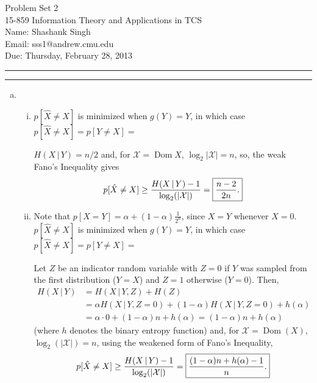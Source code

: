 \documentclass[11pt]{article}
\makeatletter
\newcounter{questionCounter}
\newcounter{partCounter}[questionCounter]
\newenvironment{question}[2][\arabic{questionCounter}]{%
    \setcounter{partCounter}{0}%
    \vspace{.25in} \hrule \vspace{0.5em}%
        \noindent{\bf #2}%
    \vspace{0.8em} \hrule \vspace{.10in}%
    \addtocounter{questionCounter}{1}%
}{}
\newcommand{\name}{Shashank Singh}
\newcommand{\andrew}{sss1@andrew.cmu.edu}
\newcommand{\class}{15-859 Information Theory and Applications in TCS}
\newcommand{\hwnum}{2}
\newcommand{\duedate}{Thursday, February 28, 2013}
\newcommand{\dom}{\operatorname{Dom}} %
\newcommand{\X}{\mathcal{X}}
\newcommand{\pr}[1]{\mathsf{Pr}\left( #1 \right)} %
\newcommand{\giv}{\, | \,} %
\makeatother
\begin{document}
\thispagestyle{plain}

{\Large Problem Set \hwnum} \\
\class \\
Name: \name \\
Email: \andrew \\
Due: \duedate

\begin{question}{Problem 1}
\begin{enumerate}[(a)]
\item
\begin{enumerate}[i.]
\item $p[\hat X \neq X]$ is minimized when $g(Y) = Y$, in which
case $p[\hat X \neq X] = p[Y \neq X] = $ 

$H(X \giv Y) = n/2$ and, for $\X = \dom X$, $\log_2|\X| = n$, so, the weak
Fano's Inequality gives
\[p[\hat X \neq X]
    \geq \frac{H(X \giv Y) - 1}{\log_2(|\X|)}
 = \mbox{\fbox{$\displaystyle \frac{n - 2}{2n}
$.}}\]

\item Note that $p[X = Y] = \alpha + (1 - \alpha)\frac{1}{2^n}$, since $X = Y$
whenever $X = 0$. $p[\hat X \neq X]$ is minimized when $g(Y) = Y$, in which
case
$p[\hat X \neq X] = p[Y \neq X]
 = $ 

Let $Z$ be an indicator random variable with $Z = 0$ if $Y$ was sampled from
the first distribution ($Y = X$) and $Z = 1$ otherwise ($Y = 0$). Then,
\begin{align*}
H(X \giv Y)
 & = H(X \giv Y, Z) + H(Z) \\
 & = \alpha H(X \giv Y, Z = 0) + (1 - \alpha)H(X \giv Y, Z = 0) + h(\alpha) \\
 & = \alpha \cdot 0 + (1 - \alpha)n + h(\alpha)
   = (1 - \alpha)n + h(\alpha)
\end{align*}
(where $h$ denotes the binary entropy function) and, for $\X = \dom(X)$,
$\log_2(|\X|) = n$, using the weakened form of Fano's Inequality,
\[p[\hat X \neq X]
    \geq \frac{H(X \giv Y) - 1}{\log_2(|\X|)}
 = \mbox{\fbox{$\displaystyle \frac{(1 - \alpha)n + h(\alpha) - 1}{n}
$.}}\]
\end{enumerate}


\end{enumerate}
\end{question}
\end{document}
